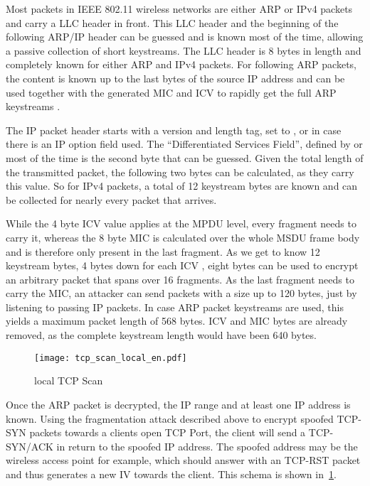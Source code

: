 \documentclass[a4paper,10pt]{scrartcl}
\begin{document}
Most packets in IEEE 802.11 wireless networks are either ARP or IPv4 packets and carry a LLC header in front. This LLC header and the
beginning of the following ARP/IP header can be guessed and is known most of the time, allowing a passive collection of short
keystreams. The LLC header is 8 bytes in length and completely known for either ARP and IPv4 packets. For following ARP packets,
the content is known up to the last bytes of the source IP address and can be used together with the generated MIC and ICV to rapidly
get the full ARP keystreams \citep{OM09}.

The IP packet header starts with a version and length tag, set to , or  in case there is an IP option field
used. The ``Differentiated Services Field'', defined by  or  most of the time is the second byte that can be guessed. Given
the total length of the transmitted packet, the following two bytes can be calculated, as they carry this value. So for IPv4 packets,
a total of 12 keystream bytes are known and can be collected for nearly every packet that arrives.

While the 4 byte ICV value applies at the MPDU level, every fragment needs to carry it, whereas the 8 byte MIC is calculated over the
whole MSDU frame body and is therefore only present in the last fragment. As we get to know 12 keystream bytes, 4 bytes down for each ICV
, eight bytes can be used to encrypt an arbitrary packet that spans over 16 fragments. As the last fragment needs to carry the MIC,
an attacker can send packets with a size up to 120 bytes, just by listening to passing IP packets. In case ARP packet keystreams are
used, this yields a maximum packet length of 568 bytes. ICV and MIC bytes are already removed, as the complete keystream length would
have been 640 bytes.

\begin{figure}[htbp]
  \centering
    \texttt{[image: tcp\_scan\_local\_en.pdf]}
  \caption{local TCP Scan}
  \label{figure:tcp_scan_local}
\end{figure}

Once the ARP packet is decrypted, the IP range and at least one IP address is known. Using the fragmentation attack described above to
encrypt spoofed TCP-SYN packets towards a clients open TCP Port, the client will send a TCP-SYN/ACK in return to the spoofed IP address.
The spoofed address may be the wireless access point for example, which should answer with an TCP-RST packet and thus generates a new
IV towards the client. This schema is shown in~\ref{figure:tcp_scan_local}.
\end{document}
